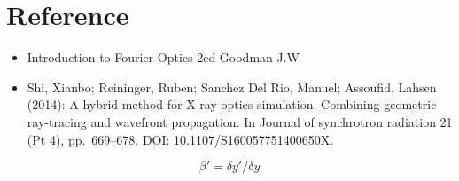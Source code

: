 \documentclass[../main.tex]{subfiles}
\begin{document}
	\section{Reference}
	\begin{itemize}
	\item Introduction to Fourier Optics 2ed Goodman J.W
	\item Shi, Xianbo; Reininger, Ruben; Sanchez Del Rio, Manuel; Assoufid, Lahsen (2014): A hybrid method for X-ray optics simulation. Combining geometric ray-tracing and wavefront propagation. In Journal of synchrotron radiation 21 (Pt 4), pp. 669–678. DOI: 10.1107/S160057751400650X.
	\end{itemize}

	\begin{equation}
	\beta'=\delta y'/\delta y
	\end{equation}
\end{document}
